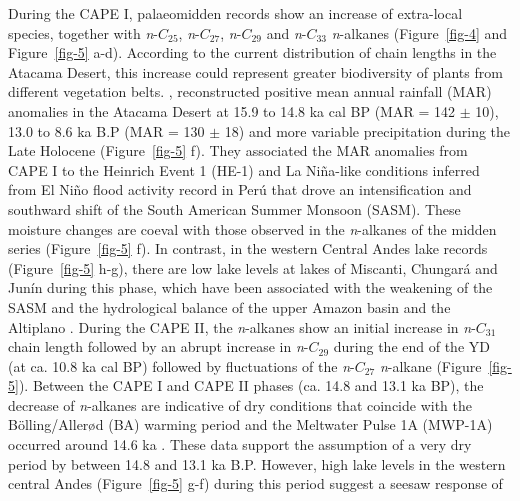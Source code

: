 \documentclass[
  authoryear,
  preprint,
  3p]{elsarticle}
\begin{document}
\begin{figure}
\end{figure}

\newpage{}

During the CAPE I, palaeomidden records show an increase of extra-local
species, together with \emph{n}-\(C_{25}\), \emph{n}-\(C_{27}\),
\emph{n}-\(C_{29}\) and \emph{n}-\(C_{33}\) \emph{n}-alkanes
(Figure~\ref{fig-4} and Figure~\ref{fig-5} a-d). According to the
current distribution of chain lengths in the Atacama Desert, this
increase could represent greater biodiversity of plants from different
vegetation belts. \citet{gonzalez-pinillaHighLowlatitudeForcings2021},
reconstructed positive mean annual rainfall (MAR) anomalies in the
Atacama Desert at 15.9 to 14.8 ka cal BP (MAR = 142 \(\pm\) 10), 13.0 to
8.6 ka B.P (MAR = 130 \(\pm\) 18) and more variable precipitation during
the Late Holocene (Figure~\ref{fig-5} f). They associated the MAR
anomalies from CAPE I to the Heinrich Event 1 (HE-1) and La Niña-like
conditions inferred from El Niño flood activity record in Perú
\citep{reinNinoVariabilityPeru2005} that drove an intensification and
southward shift of the South American Summer Monsoon (SASM). These
moisture changes are coeval with those observed in the \emph{n}-alkanes
of the midden series (Figure~\ref{fig-5} f). In contrast, in the western
Central Andes lake records (Figure~\ref{fig-5} h-g), there are low lake
levels at lakes of Miscanti, Chungará and Junín during this phase, which
have been associated with the weakening of the SASM and the hydrological
balance of the upper Amazon basin and the Altiplano
\citep{valero-garcesLimnogeologyLagunaMiscanti1996, moreno14kyrRecordTropical2007a, rodbell700000Years2022}.
During the CAPE II, the \emph{n}-alkanes show an initial increase in
\emph{n}-\(C_{31}\) chain length followed by an abrupt increase in
\emph{n}-\(C_{29}\) during the end of the YD (at ca. 10.8 ka cal BP)
followed by fluctuations of the \emph{n}-\(C_{27}\) \emph{n}-alkane
(Figure~\ref{fig-5}). Between the CAPE I and CAPE II phases (ca. 14.8
and 13.1 ka BP), the decrease of \emph{n}-alkanes are indicative of dry
conditions that coincide with the Bölling/Allerød (BA) warming period
and the Meltwater Pulse 1A (MWP-1A) occurred around 14.6 ka
\citep{liuTransientSimulationLast2009, obaseAbruptBollingAllerodWarming2019, heFreshwaterForcingAtlantic2022}.
These data support the assumption of a very dry period by
\citet{gonzalez-pinillaHighLowlatitudeForcings2021} between 14.8 and
13.1 ka B.P. However, high lake levels in the western central Andes
(Figure~\ref{fig-5} g-f) during this period suggest a seesaw response of
\end{document}
